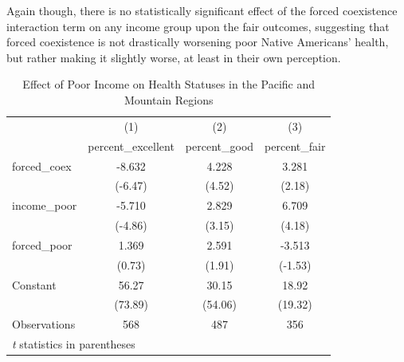 \documentclass[12pt]{article}
\begin{document}
Again though, there is no statistically significant effect of the forced coexistence interaction term on any income group upon the fair outcomes, suggesting that forced coexistence is not drastically worsening poor Native Americans’ health, but rather making it slightly worse, at least in their own perception. 

\begin{table}[htbp]\centering \caption{Effect of Poor Income on Health Statuses in the Pacific and Mountain Regions\label{pmpoor}} \begin{tabular}{l*{3}{c}} \toprule
                    &\multicolumn{1}{c}{(1)}&\multicolumn{1}{c}{(2)}&\multicolumn{1}{c}{(3)}\\
                    &\multicolumn{1}{c}{percent\_excellent}&\multicolumn{1}{c}{percent\_good}&\multicolumn{1}{c}{percent\_fair}\\
\midrule
forced\_coex         &      -8.632&       4.228&       3.281\\
                    &     (-6.47)&      (4.52)&      (2.18)\\
\addlinespace
income\_poor         &      -5.710&       2.829&       6.709\\
                    &     (-4.86)&      (3.15)&      (4.18)\\
\addlinespace
forced\_poor         &       1.369&       2.591&      -3.513\\
                    &      (0.73)&      (1.91)&     (-1.53)\\
\addlinespace
Constant            &       56.27&       30.15&       18.92\\
                    &     (73.89)&     (54.06)&     (19.32)\\
\midrule
Observations        &         568&         487&         356\\
\bottomrule
\multicolumn{4}{l}{\footnotesize \textit{t} statistics in parentheses}\\
\end{tabular}
\end{table}
\end{document}
